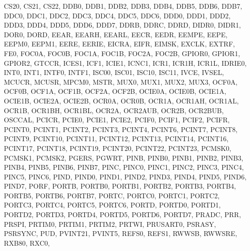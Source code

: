 {{                CS20, CS21, CS22, 
                DDB0, DDB1, DDB2, DDB3, DDB4, DDB5, DDB6, DDB7, 
                DDC0, DDC1, DDC2, DDC3, DDC4, DDC5, DDC6, 
                DDD0, DDD1, DDD2, DDD3, DDD4, DDD5, DDD6, DDD7, 
                DDRB, DDRC, DDRD, DIDR0, DIDR1, DOR0, DORD, 
                EEAR, EEARH, EEARL, EECR, EEDR, EEMPE, EEPE, 
                EEPM0, EEPM1, EERE, EERIE, EICRA, EIFR, EIMSK, 
                EXCLK, EXTRF, FE0, 
                FOC0A, FOC0B, FOC1A, FOC1B, FOC2A, FOC2B, 
                GPIOR0, GPIOR1, GPIOR2, GTCCR, 
                ICES1, ICF1, ICIE1, ICNC1, ICR1, ICR1H, ICR1L, 
                IDRIE0, INT0, INT1, INTF0, INTF1, ISC00, ISC01, 
                ISC10, ISC11, IVCE, IVSEL, 
                MCUCR, MCUSR, MPCM0, MSTR, MUX0, MUX1, MUX2, 
                MUX3, 
                OCF0A, OCF0B, OCF1A, OCF1B, OCF2A, OCF2B, 
                OCIE0A, OCIE0B, OCIE1A, OCIE1B, OCIE2A, OCIE2B,
                OCR0A, OCR0B, OCR1A, OCR1AH, OCR1AL, OCR1B, 
                OCR1BH, OCR1BL, OCR2A, OCR2AUB, OCR2B, OCR2BUB,
                OSCCAL, 
                PCICR, PCIE0, PCIE1, PCIE2, PCIF0, PCIF1, 
                PCIF2, PCIFR, 
                PCINT0, PCINT1, PCINT2, PCINT3, PCINT4, PCINT6,
                PCINT7, PCINT8, PCINT9, PCINT10, PCINT11, 
                PCINT12, PCINT13, PCINT14, PCINT16, PCINT17, 
                PCINT18, PCINT19, PCINT20, PCINT22, PCINT23, 
                PCMSK0, PCMSK1, PCMSK2, PGERS, PGWRT, 
                PINB, 
                PINB0, PINB1, PINB2, PINB3, PINB4, PINB5, PINB6,
                PINB7, 
                PINC, 
                PINC0, PINC1, PINC2, PINC3, PINC4, PINC5, PINC6,  
                PIND, 
                PIND0, PIND1, PIND2, PIND3, PIND4, PIND5, PIND6,
                PIND7, 
                PORF, 
                PORTB, 
                PORTB0, PORTB1, PORTB2, PORTB3, PORTB4, PORTB5,
                PORTB6, PORTB7, 
                PORTC, 
                PORTC0, PORTC1, PORTC2, PORTC3, PORTC4, PORTC5,
                PORTC6, 
                PORTD, 
                PORTD0, PORTD1, PORTD2, PORTD3, PORTD4, PORTD5,
                PORTD6, PORTD7, 
                PRADC, PRR, PRSPI, PRTIM0, PRTIM1, PRTIM2, 
                PRTWI, PRUSART0, PSRASY, PSRSYNC, PUD, PVINT21,
                PVINT5, 
                REFS0, REFS1, RWWSB, RWWSRE, RXB80, RXC0, 
}}
